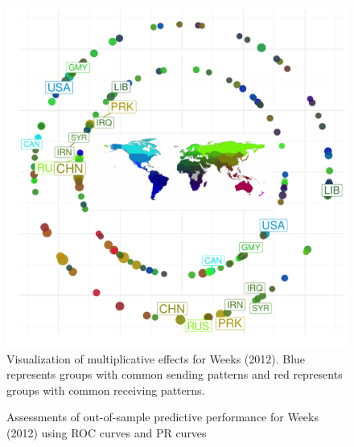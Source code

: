\begin{figure}
	\includegraphics[width=\textwidth]{weeks_circPlot.pdf}
	\caption{\label{fig:weekscirc} Visualization of multiplicative effects for Weeks (2012). Blue represents groups with common sending patterns and red represents groups with common receiving patterns.}
\end{figure}

\begin{figure}
\centering   
	\caption{Assessments of out-of-sample predictive performance for Weeks (2012) using ROC curves and PR curves}
\end{figure}

